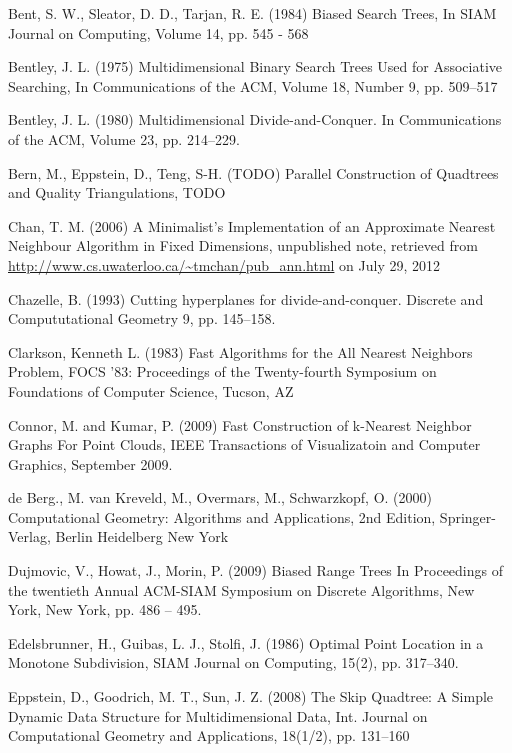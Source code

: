 \documentclass[mcs]{scsthesis}
\begin{document}
\begin{thebibliography}{5}
Bent, S. W., Sleator, D. D., Tarjan, R. E. (1984) Biased Search Trees,
In SIAM Journal on Computing, Volume 14, pp. 545 - 568

Bentley, J. L. (1975) Multidimensional Binary Search Trees Used for Associative
Searching, In Communications of the ACM, Volume 18, Number 9, pp. 509--517 

Bentley, J. L. (1980) Multidimensional Divide-and-Conquer.
In Communications of the ACM, Volume 23, pp. 214--229.

Bern, M., Eppstein, D., Teng, S-H. (TODO) Parallel Construction of Quadtrees and
Quality Triangulations, TODO

Chan, T. M. (2006) A Minimalist's Implementation of an Approximate Nearest
Neighbour Algorithm in Fixed Dimensions, unpublished note, retrieved from
\url{http://www.cs.uwaterloo.ca/~tmchan/pub\_ann.html} on July 29, 2012

 Chazelle, B. (1993) Cutting hyperplanes for divide-and-conquer.
Discrete and Compututational Geometry 9, pp. 145--158.

Clarkson, Kenneth L. (1983) Fast Algorithms for the All Nearest Neighbors Problem,
FOCS '83: Proceedings of the Twenty-fourth Symposium on Foundations of Computer Science,
Tucson, AZ 

Connor, M. and Kumar, P. (2009) Fast Construction of k-Nearest Neighbor Graphs
For Point Clouds, IEEE Transactions of Visualizatoin and Computer Graphics,
September 2009.

de Berg., M. van Kreveld, M., Overmars, M., Schwarzkopf, O. (2000)
Computational Geometry: Algorithms and Applications, 2nd Edition, Springer-Verlag,
Berlin Heidelberg New York

Dujmovic, V., Howat, J., Morin, P. (2009) Biased Range Trees
In Proceedings of the twentieth Annual ACM-SIAM Symposium on Discrete Algorithms,
New York, New York, pp. 486 -- 495.

Edelsbrunner, H., Guibas, L. J., Stolfi, J. (1986) Optimal Point Location in a
Monotone Subdivision, SIAM Journal on Computing, 15(2), pp. 317--340. 

Eppstein, D., Goodrich, M. T., Sun, J. Z. (2008) The Skip Quadtree: A Simple
Dynamic Data Structure for Multidimensional Data, Int. Journal on Computational
Geometry and Applications, 18(1/2), pp. 131--160 


\end{thebibliography}
\end{document}
